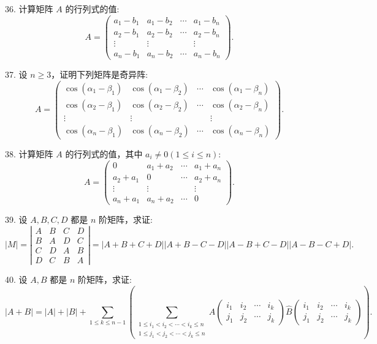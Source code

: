\documentclass[UTF8, 12pt, fontset=fandol, oneside]{ctexart}
\begin{document}
36. 计算矩阵 $A$ 的行列式的值:
\[
A=\left(\begin{array}{cccc}
a_1-b_1 & a_1-b_2 & \cdots & a_1-b_n\\
a_2-b_1 & a_2-b_2 & \cdots & a_2-b_n\\
\vdots & \vdots & & \vdots\\
a_n-b_1 & a_n-b_2 & \cdots & a_n-b_n
\end{array}\right).
\]

37. 设 $n\geq 3$，证明下列矩阵是奇异阵:
\[
A=\left(\begin{array}{cccc}
\cos(\alpha_1-\beta_1) & \cos(\alpha_1-\beta_2) & \cdots & \cos(\alpha_1-\beta_n)\\
\cos(\alpha_2-\beta_1) & \cos(\alpha_2-\beta_2) & \cdots & \cos(\alpha_2-\beta_n)\\
\vdots & \vdots & & \vdots\\
\cos(\alpha_n-\beta_1) & \cos(\alpha_n-\beta_2) & \cdots & \cos(\alpha_n-\beta_n)
\end{array}\right).
\]

38. 计算矩阵 $A$ 的行列式的值，其中 $a_i\neq 0(1\leq i\leq n)$:
\[
A=\left(\begin{array}{cccc}
0 & a_1+a_2 & \cdots & a_1+a_n\\
a_2+a_1 & 0 & \cdots & a_2+a_n\\
\vdots & \vdots & & \vdots\\
a_n+a_1 & a_n+a_2 & \cdots & 0
\end{array}\right).
\]

39. 设 $A,B,C,D$ 都是 $n$ 阶矩阵，求证:
\[
|M|=\left|\begin{array}{cccc}
A & B & C & D\\
B & A & D & C\\
C & D & A & B\\
D & C & B & A
\end{array}\right|
=|A+B+C+D||A+B-C-D||A-B+C-D||A-B-C+D|.
\]

40. 设 $A,B$ 都是 $n$ 阶矩阵，求证:
\[
|A+B|=|A|+|B|+
\sum_{1\leq k\leq n-1}
\left(
\sum_{\substack{1\leq i_1<i_2<\cdots<i_k\leq n\\
1\leq j_1<j_2<\cdots<j_k\leq n}}
A\left(\begin{array}{cccc}
i_1 & i_2 & \cdots & i_k\\
j_1 & j_2 & \cdots & j_k
\end{array}\right)
\widehat{B}\left(\begin{array}{cccc}
i_1 & i_2 & \cdots & i_k\\
j_1 & j_2 & \cdots & j_k
\end{array}\right)
\right).
\]
\end{document}

